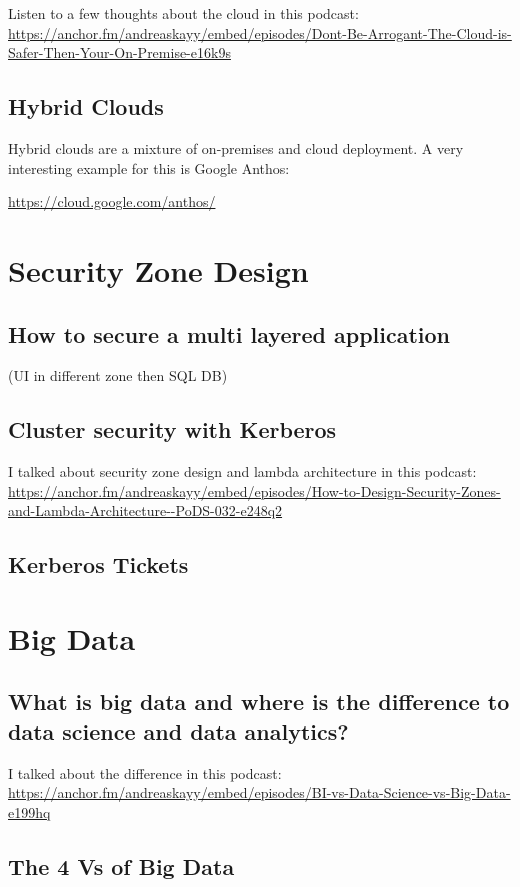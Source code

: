 \documentclass[12pt, numbers=noenddot]{scrreprt} %
\begin{document}
Listen to a few thoughts about the cloud in this podcast:
\url{https://anchor.fm/andreaskayy/embed/episodes/Dont-Be-Arrogant-The-Cloud-is-Safer-Then-Your-On-Premise-e16k9s}

\section{Hybrid Clouds}

Hybrid clouds are a mixture of on-premises and cloud deployment. A very interesting example for this is Google Anthos:

\url{https://cloud.google.com/anthos/}

\chapter{Security Zone Design}
\section{How to secure a multi layered application}
(UI in different zone then SQL DB)

\section{Cluster security with Kerberos}

I talked about security zone design and lambda architecture in this podcast: \url{https://anchor.fm/andreaskayy/embed/episodes/How-to-Design-Security-Zones-and-Lambda-Architecture--PoDS-032-e248q2}

\section{Kerberos Tickets}


\chapter{Big Data}
\section{What is big data and where is the difference to data science and data analytics?}
I talked about the difference in this podcast: \url{https://anchor.fm/andreaskayy/embed/episodes/BI-vs-Data-Science-vs-Big-Data-e199hq}

\section{The 4 Vs of Big Data}
\end{document}
